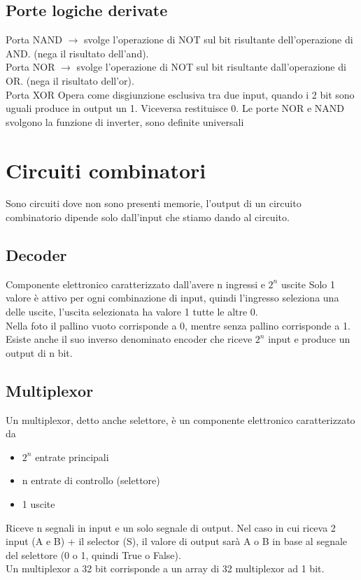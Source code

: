 \documentclass[12pt, a4paper, openany]{book}
\begin{document}
\section{Porte logiche derivate}
Porta NAND $\to$ svolge l'operazione di NOT sul bit risultante dell'operazione di AND. 
(nega il risultato dell'and).
\\ Porta NOR $ \to $ svolge l'operazione di NOT sul bit risultante dall'operazione di OR.
(nega il risultato dell'or).
\\ Porta XOR Opera come disgiunzione esclusiva tra due input, quando i 2 bit sono uguali produce in output un 1. 
Viceversa restituisce 0.
Le porte NOR e NAND svolgono la funzione di inverter, sono definite universali
\chapter{Circuiti combinatori}
Sono circuiti dove non sono presenti memorie, l'output di un circuito combinatorio
dipende solo dall'input che stiamo dando al circuito.
\section{Decoder}
Componente elettronico caratterizzato dall'avere n ingressi e $2^n$ uscite
Solo 1 valore è attivo per ogni combinazione di input, quindi l'ingresso seleziona 
una delle uscite, l'uscita selezionata ha valore 1 tutte le altre 0.
\\ Nella foto il pallino vuoto corrisponde a 0, mentre senza pallino corrisponde a 1.
Esiste anche il suo inverso denominato encoder che riceve $2^n$ input e produce un output
di n bit.

\section{Multiplexor}
Un multiplexor, detto anche selettore, è un componente elettronico caratterizzato da
\begin{itemize}
    \item $2^n$ entrate principali
    \item n entrate di controllo (selettore)
    \item 1 uscite
\end{itemize}
Riceve n segnali in input e un solo segnale di output.
Nel caso in cui riceva 2 input (A e B) + il selector (S), il valore di output sarà A o B
in base al segnale del selettore (0 o 1, quindi True o False).
\\ Un multiplexor a 32 bit corrisponde a un array di 32 multiplexor ad 1 bit.
\end{document}
